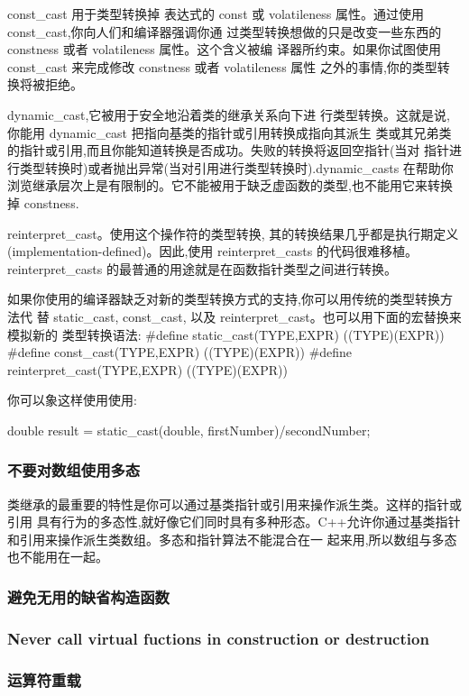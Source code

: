 const_cast 用于类型转换掉 表达式的 const 或 volatileness 属性。通过使用 const_cast,你向人们和编译器强调你通 过类型转换想做的只是改变一些东西的 constness 或者 volatileness 属性。这个含义被编 译器所约束。如果你试图使用 const_cast 来完成修改 constness 或者 volatileness 属性 之外的事情,你的类型转换将被拒绝。

dynamic_cast,它被用于安全地沿着类的继承关系向下进 行类型转换。这就是说,你能用 dynamic_cast 把指向基类的指针或引用转换成指向其派生 类或其兄弟类的指针或引用,而且你能知道转换是否成功。失败的转换将返回空指针(当对 指针进行类型转换时)或者抛出异常(当对引用进行类型转换时).dynamic_casts 在帮助你浏览继承层次上是有限制的。它不能被用于缺乏虚函数的类型,也不能用它来转换掉 constness.

reinterpret_cast。使用这个操作符的类型转换, 其的转换结果几乎都是执行期定义(implementation-defined)。因此,使用 reinterpret_casts 的代码很难移植。
reinterpret_casts 的最普通的用途就是在函数指针类型之间进行转换。

如果你使用的编译器缺乏对新的类型转换方式的支持,你可以用传统的类型转换方法代 替 static_cast, const_cast, 以及 reinterpret_cast。也可以用下面的宏替换来模拟新的 类型转换语法:
\#define static_cast(TYPE,EXPR) ((TYPE)(EXPR)) 
\#define const_cast(TYPE,EXPR) ((TYPE)(EXPR)) 
\#define reinterpret_cast(TYPE,EXPR) ((TYPE)(EXPR)) 

你可以象这样使用使用:

double result = static_cast(double, firstNumber)/secondNumber;

\subsubsection{不要对数组使用多态}
类继承的最重要的特性是你可以通过基类指针或引用来操作派生类。这样的指针或引用 具有行为的多态性,就好像它们同时具有多种形态。C++允许你通过基类指针和引用来操作派生类数组。多态和指针算法不能混合在一 起来用,所以数组与多态也不能用在一起。

\subsubsection{避免无用的缺省构造函数}
\subsubsection{Never call virtual fuctions in construction or destruction}
\subsubsection{运算符重载}
